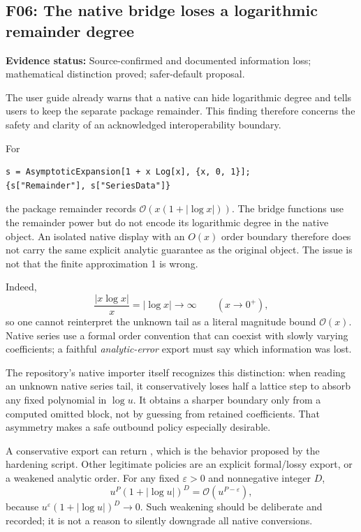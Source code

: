 \documentclass[11pt,a4paper]{article}
\newcommand{\OO}{\mathcal O}
\newcommand{\code}[1]{\texttt{\detokenize{#1}}}
\newcommand{\finding}[2]{\subsection{#1: #2}}
\newcommand{\status}[1]{\textbf{Evidence status:} #1.\par}
\begin{document}
\finding{F06}{The native bridge loses a logarithmic remainder degree}
\status{Source-confirmed and documented information loss; mathematical distinction proved; safer-default proposal}

The user guide already warns that a native \code{SeriesData} can hide logarithmic degree and tells users to keep the separate package remainder. This finding therefore concerns the safety and clarity of an acknowledged interoperability boundary.\cite{guide}

For
\begin{lstlisting}
s = AsymptoticExpansion[1 + x Log[x], {x, 0, 1}];
{s["Remainder"], s["SeriesData"]}
\end{lstlisting}
the package remainder records $\OO(x(1+|\log x|))$. The bridge functions use the remainder power but do not encode its logarithmic degree in the native object. An isolated native display with an $O(x)$ order boundary therefore does not carry the same explicit analytic guarantee as the original object. The issue is not that the finite approximation 1 is wrong.

Indeed,
\begin{equation}
 \frac{|x\log x|}{x}=|\log x|\longrightarrow\infty
 \qquad(x\to0^+),
\end{equation}
so one cannot reinterpret the unknown tail as a literal magnitude bound $\OO(x)$. Native series use a formal order convention that can coexist with slowly varying coefficients; a faithful \emph{analytic-error} export must say which information was lost.\cite{wl-seriesdata}

The repository's native importer itself recognizes this distinction: when reading an unknown native series tail, it conservatively loses half a lattice step to absorb any fixed polynomial in $\log u$. It obtains a sharper boundary only from a computed omitted block, not by guessing from retained coefficients. That asymmetry makes a safe outbound policy especially desirable.\cite{native}

A conservative export can return \code{Missing["LogarithmicRemainder"]}, which is the behavior proposed by the hardening script. Other legitimate policies are an explicit formal/lossy export, or a weakened analytic order. For any fixed $\varepsilon>0$ and nonnegative integer $D$,
\begin{equation}
 u^P(1+|\log u|)^D=\OO(u^{P-\varepsilon}),
\end{equation}
because $u^{\varepsilon}(1+|\log u|)^D\to0$. Such weakening should be deliberate and recorded; it is not a reason to silently downgrade all native conversions.
\end{document}
